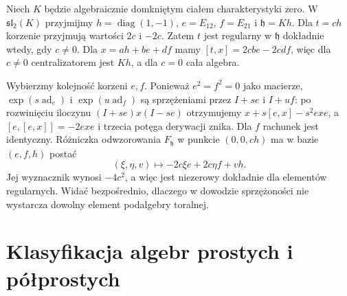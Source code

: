 \begin{przyklad}
\label{aa:prz:lie-regular-sl2}
Niech $K$ będzie algebraicznie domkniętym ciałem charakterystyki zero. W $\mathfrak{sl}_2(K)$ przyjmijmy $h=\operatorname{diag}(1,-1)$, $e=E_{12}$, $f=E_{21}$ i $\mathfrak h=Kh$. Dla $t=ch$ korzenie przyjmują wartości $2c$ i $-2c$. Zatem $t$ jest regularny w $\mathfrak h$ dokładnie wtedy, gdy $c\ne0$. Dla $x=ah+be+df$ mamy $[t,x]=2cbe-2cdf$, więc dla $c\ne0$ centralizatorem jest $Kh$, a dla $c=0$ cała algebra.

Wybierzmy kolejność korzeni $e,f$. Ponieważ $e^2=f^2=0$ jako macierze, $\exp(s\operatorname{ad}_e)$ i $\exp(u\operatorname{ad}_f)$ są sprzężeniami przez $I+se$ i $I+uf$: po rozwinięciu iloczynu $(I+se)x(I-se)$ otrzymujemy $x+s[e,x]-s^2exe$, a $[e,[e,x]]=-2exe$ i trzecia potęga derywacji znika. Dla $f$ rachunek jest identyczny. Różniczka odwzorowania $F_{\mathfrak h}$ w punkcie $(0,0,ch)$ ma w bazie $(e,f,h)$ postać
\[
 (\xi,\eta,v)\longmapsto -2c\xi e+2c\eta f+vh.
\]
Jej wyznacznik wynosi $-4c^2$, a więc jest niezerowy dokładnie dla elementów regularnych. Widać bezpośrednio, dlaczego w dowodzie sprzężoności nie wystarcza dowolny element podalgebry toralnej.
\end{przyklad}

\section{Klasyfikacja algebr prostych i półprostych}

